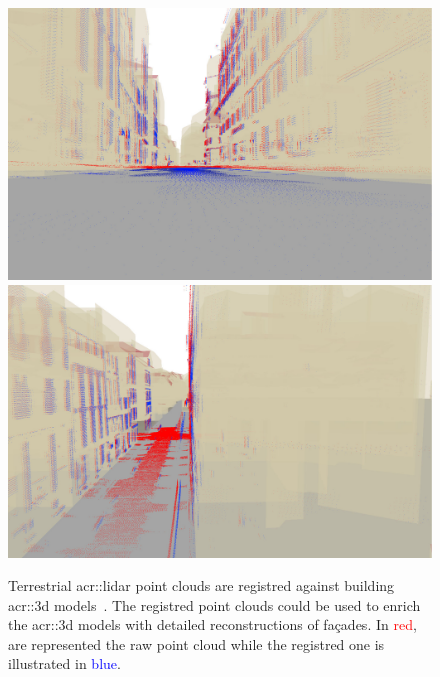             \begin{figure}[htpb]
                \centering
                \includegraphics[width=.48\textwidth]{images/introduction/registration_1}
                \includegraphics[width=.48\textwidth]{images/introduction/registration_2}
                \caption{
                    \label{fig::3d_model_terrestrial_registration} Terrestrial \gls{acr::lidar} point clouds are registred against building \gls{acr::3d} models~\parencite{monnier2014}.
                    The registred point clouds could be used to enrich the \gls{acr::3d} models with detailed reconstructions of fa\c{c}ades.
                    In \textcolor{Red}{red}, are represented the raw point cloud while the registred one is illustrated in \textcolor{Blue}{blue}.
                }
            \end{figure}


